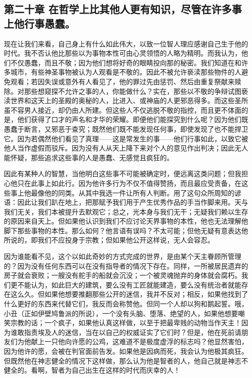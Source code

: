 
\subsection{第二十章 在哲学上比其他人更有知识，尽管在许多事上他行事愚蠢。}

现在让我们来看，自己身上有什么如此伟大，以致一位智人理应感谢自己生于他的时代。我不否认他比那些以为事物本性可由心灵领悟的人略为精明。而我认为，他们不仅愚蠢，而且不敬；因为他们想将好奇的眼睛投向那的秘密。我们知道在和许多城市，有些神圣事物被认为人观看是不敬的。因此不被允许亵渎那些物件的人避免观看；若因失误或意外有人看见了，他的罪过先由惩罚、然后由重复祭献来赎除。对那些想窥探不允许之事的人，你能做什么？实在，那些以不敬的争辩试图亵渎世界和这天上的圣殿的奥秘的人，比进入、或神庙的人更邪恶得多。而这些圣所虽不容男人接近，却仍由人所建。但这些人不仅逃脱不敬的指控，而且更不体面的是，他们获得了口才的声名和才华的荣耀。即便他们能探究到什么呢？因为他们既愚蠢于断言，又邪恶于查究；既然他们既不能发现任何事，即使发现了也不能捍卫它。因为若偶然他们看见了真理——这是常发生的事——他们行事如此，以致它被他人当作虚假而驳斥。因为没有人从天上降下来对个人的意见作出判决；因此无人能怀疑，那些追求这些事的人是愚蠢、无感觉且疯狂的。\par

因此有某种人的智慧，当他明白这些事不可能被确定时，便远离这类问题；但我担心他只在此事上如此行。因为他许多行为不仅不值得赞扬，而且最应受责备，在这些事上他最像他的同类。从其中我选一件让所有人判断。用了这句众所周知的谚语：因此让我们趴在地上，把那赋予我们用于产生优秀作品的手当作脚来用。天与我们无关，我们本被提升去默观它；总之，光本身与我们无干；无疑我们赖以生存的原因来自天上。但如果他认识到我们不应讨论天界事物的本性，他也无法理解他脚下那些事物的本性。那么如何？他言语有误吗？不太可能；但他无疑有意表达他所说的，即我们不应投身于宗教；但如果他公开这样说，无人会容忍。\par

因为谁能看不见，这个以如此奇妙的方式完成的世界，是由某个天主眷顾所管理的？因为没有任何东西可以在没有指导者的情况下存在。同样，一所被居民遗弃的房子就会衰败；一艘没有舵手的船就会沉没；一个被灵魂抛弃的身体就会腐朽。我们更不能认为，如此巨大的建筑，要么没有工匠就能建造，要么没有统治者就能存在这么久。但如果他想要推翻那些公开的迷信，我并不反对；相反，如果他找到了什么更好的东西来代替它们，我反而会称赞他。但同一个人却以狗和鹅起誓。哦，小丑（正如伊壁鸠鲁派的所说），一个没有头脑、堕落、绝望的人，如果他想要嘲笑宗教的话；一个疯子，如果他认真这样做，以至于把最卑贱的动物当作天主！因为谁敢指责埃及人的迷信，当在以自己的权威证实了它们时？但是，他在死前请朋友们为他献上一只他向许愿的公鸡，这难道不是极度虚浮的标志吗？他显然害怕，因为他许的愿，会被在判官面前告发。如果他是因病而死，我会认为他极其疯狂。但既然他在神志健全的情况下这样做，那么认为他是智者的人，他自己就是神志不健全的。看啊，智者为自己出生在这样的时代而庆幸的人！\par

